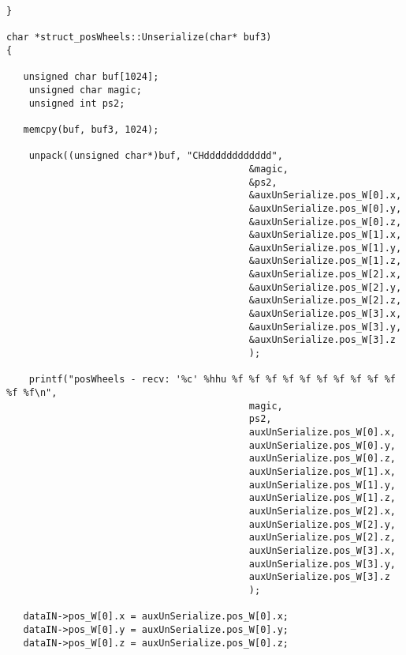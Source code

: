 \begin{verbatim}
}

char *struct_posWheels::Unserialize(char* buf3)
{

   unsigned char buf[1024];
    unsigned char magic;
    unsigned int ps2;

   memcpy(buf, buf3, 1024);

    unpack((unsigned char*)buf, "CHdddddddddddd",
                                           &magic,
                                           &ps2,
                                           &auxUnSerialize.pos_W[0].x,
                                           &auxUnSerialize.pos_W[0].y,
                                           &auxUnSerialize.pos_W[0].z,
                                           &auxUnSerialize.pos_W[1].x,
                                           &auxUnSerialize.pos_W[1].y,
                                           &auxUnSerialize.pos_W[1].z,
                                           &auxUnSerialize.pos_W[2].x,
                                           &auxUnSerialize.pos_W[2].y,
                                           &auxUnSerialize.pos_W[2].z,
                                           &auxUnSerialize.pos_W[3].x,
                                           &auxUnSerialize.pos_W[3].y,
                                           &auxUnSerialize.pos_W[3].z
                                           );

    printf("posWheels - recv: '%c' %hhu %f %f %f %f %f %f %f %f %f %f %f %f\n",
                                           magic,
                                           ps2,
                                           auxUnSerialize.pos_W[0].x,
                                           auxUnSerialize.pos_W[0].y,
                                           auxUnSerialize.pos_W[0].z,
                                           auxUnSerialize.pos_W[1].x,
                                           auxUnSerialize.pos_W[1].y,
                                           auxUnSerialize.pos_W[1].z,
                                           auxUnSerialize.pos_W[2].x,
                                           auxUnSerialize.pos_W[2].y,
                                           auxUnSerialize.pos_W[2].z,
                                           auxUnSerialize.pos_W[3].x,
                                           auxUnSerialize.pos_W[3].y,
                                           auxUnSerialize.pos_W[3].z
                                           );

   dataIN->pos_W[0].x = auxUnSerialize.pos_W[0].x;
   dataIN->pos_W[0].y = auxUnSerialize.pos_W[0].y;
   dataIN->pos_W[0].z = auxUnSerialize.pos_W[0].z;


\end{verbatim}
